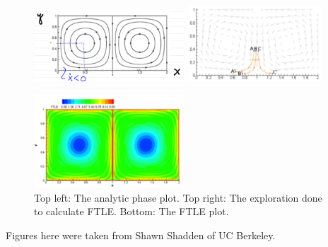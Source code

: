 \begin{ex}
\begin{figure}[h]
	\centering
	\includegraphics[width=0.5\textwidth]{figures/ch1/11contour_phase.png}
	\hspace{0.03\textwidth}
	\includegraphics[width=0.45\textwidth]{figures/ch1/12ftle_exploration.png}
	\caption{}
	\includegraphics[width=0.5\textwidth]{figures/ch1/13ftle_final.png}
	\caption{Top left: The analytic phase plot. Top right: The exploration done to calculate FTLE. Bottom: The FTLE plot.}
\end{figure}
Figures here were taken from Shawn Shadden of UC Berkeley.
\end{ex}

